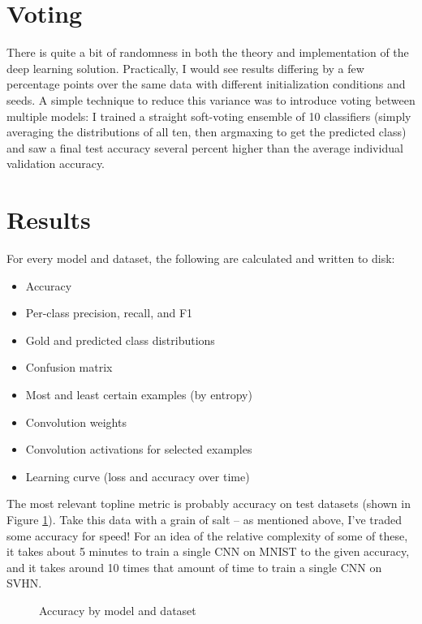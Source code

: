 \documentclass{article}
\begin{document}
\section{Voting}

There is quite a bit of randomness in both the theory and implementation of the deep learning solution.  Practically, I would see results differing by a few percentage points over the same data with different initialization conditions and seeds. A simple technique to reduce this variance was to introduce voting between multiple models: I trained a straight soft-voting ensemble of 10 classifiers (simply averaging the distributions of all ten, then argmaxing to get the predicted class) and saw a final test accuracy several percent higher than the average individual validation accuracy.

\section{Results}

For every model and dataset, the following are calculated and written to disk:

\begin{itemize}
  \item Accuracy
  \item Per-class precision, recall, and F1
  \item Gold and predicted class distributions
  \item Confusion matrix
  \item Most and least certain examples (by entropy)
  \item Convolution weights
  \item Convolution activations for selected examples
  \item Learning curve (loss and accuracy over time)
\end{itemize}

The most relevant topline metric is probably accuracy on test datasets (shown in Figure \ref{fig:accuracy}). Take this data with a grain of salt -- as mentioned above, I've traded some accuracy for speed! For an idea of the relative complexity of some of these, it takes about 5 minutes to train a single CNN on MNIST to the given accuracy, and it takes around 10 times that amount of time to train a single CNN on SVHN.

\begin{figure}[htbp]
\centering
{}
\caption{Accuracy by model and dataset}
\label{fig:accuracy}
\end{figure}
\end{document}
